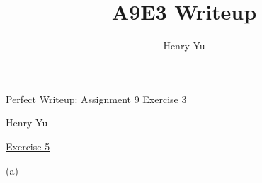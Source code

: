\documentclass[12pt,a4paper]{article}
\author{Henry Yu}
\title{A9E3 Writeup}
\begin{document}
\begin{titlepage}
	
	\begin{center}

		\vspace*{\fill}

    	\vspace*{0.5cm}
	
	    \huge{Perfect Writeup: Assignment 9 Exercise 3}
	
	    \vspace*{0.5cm}
	
	    \large{Henry Yu}
	
    	\vspace*{\fill}

	\end{center}

\end{titlepage}

\raggedright

\underline{Exercise 5}

\bigbreak


 
 \vspace{1cm}
 
(a) 
 
 
\end{document}
